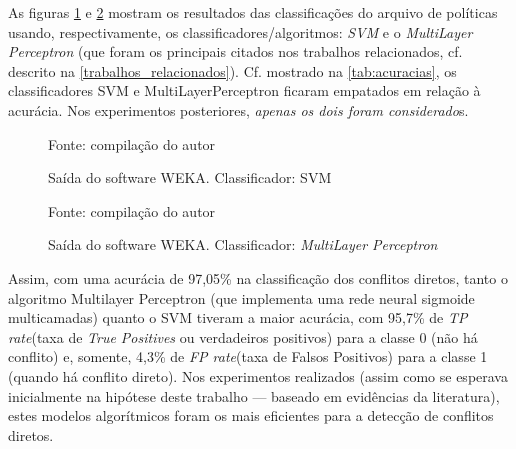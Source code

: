 As figuras \ref{fig:saida_svm} e \ref{fig:saida_multilayerperceptron} mostram os resultados das classificações do arquivo de políticas usando, respectivamente, os classificadores/algoritmos: \textit{SVM} e o \textit{MultiLayer Perceptron} (que foram os principais citados nos trabalhos relacionados, cf. descrito na \autoref{trabalhos_relacionados}). Cf. mostrado na \autoref{tab:acuracias}, os classificadores SVM e MultiLayerPerceptron ficaram empatados em relação à acurácia. Nos experimentos posteriores, \textit{apenas os dois foram considerado}s.
\begin{figure}[h!]
	\centering
	\caption{Saída do software WEKA. Classificador: SVM}

	\label{fig:saida_svm}
	{\scriptsize Fonte: compilação do autor}
\end{figure}
\begin{figure}[h!]
	\centering
	\caption{Saída do software WEKA. Classificador: \textit{MultiLayer Perceptron}}
 
	\label{fig:saida_multilayerperceptron}
	{\scriptsize Fonte: compilação do autor}
\end{figure}

Assim, com uma acurácia de 97,05\% na classificação dos conflitos diretos, tanto o algoritmo Multilayer Perceptron (que implementa uma rede neural sigmoide multicamadas) quanto o SVM tiveram a maior acurácia, com 95,7\% de \textit{TP rate}(taxa de \textit{True Positives} ou verdadeiros positivos) para a classe 0 (não há conflito) e, somente, 4,3\% de \textit{FP rate}(taxa de Falsos Positivos) para a classe 1 (quando há conflito direto). Nos experimentos realizados (assim como se esperava inicialmente na hipótese deste trabalho --- baseado em evidências da literatura), estes modelos algorítmicos foram os mais eficientes para a detecção de conflitos diretos.

